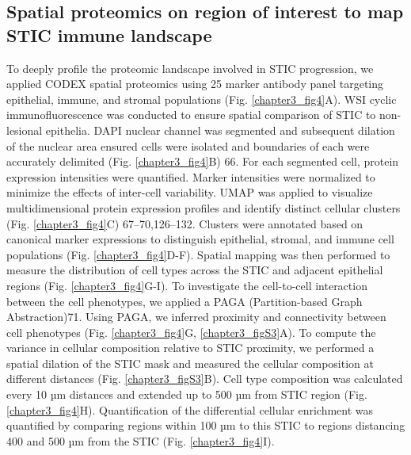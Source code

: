 \begin{refsection}
    \subsection{Spatial proteomics on region of interest to map STIC immune landscape}
    To deeply profile the proteomic landscape involved in STIC progression, we applied CODEX spatial proteomics using 25 marker antibody panel targeting epithelial, immune, and stromal populations (Fig. \ref{chapter3_fig4}A). WSI cyclic immunofluorescence was conducted to ensure spatial comparison of STIC to non-lesional epithelia. DAPI nuclear channel was segmented and subsequent dilation of the nuclear area ensured cells were isolated and boundaries of each were accurately delimited (Fig. \ref{chapter3_fig4}B) \cite{Schmidt2018Cell}66. For each segmented cell, protein expression intensities were quantified. Marker intensities were normalized to minimize the effects of inter-cell variability. UMAP was applied to visualize multidimensional protein expression profiles and identify distinct cellular clusters (Fig. \ref{chapter3_fig4}C) 67–70,126–132. Clusters were annotated based on canonical marker expressions to distinguish epithelial, stromal, and immune cell populations (Fig. \ref{chapter3_fig4}D-F). 
    Spatial mapping was then performed to measure the distribution of cell types across the STIC and adjacent epithelial regions (Fig. \ref{chapter3_fig4}G-I). To investigate the cell-to-cell interaction between the cell phenotypes, we applied a PAGA (Partition-based Graph Abstraction)\cite{Wolf2019PAGA}71. Using PAGA, we inferred proximity and connectivity between cell phenotypes (Fig. \ref{chapter3_fig4}G, \ref{chapter3_figS3}A). 
    To compute the variance in cellular composition relative to STIC proximity, we performed a spatial dilation of the STIC mask and measured the cellular composition at different distances (Fig. \ref{chapter3_figS3}B). Cell type composition was calculated every 10 µm distances and extended up to 500 µm from STIC region (Fig. \ref{chapter3_fig4}H). Quantification of the differential cellular enrichment was quantified by comparing regions within 100 µm to this STIC to regions distancing 400 and 500 µm from the STIC (Fig. \ref{chapter3_fig4}I).
    

\end{refsection}
